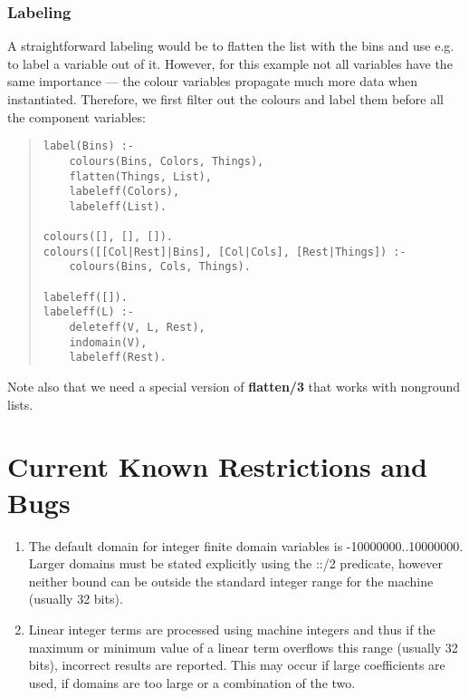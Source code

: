 \subsubsection{Labeling}
A straightforward labeling would be to flatten the list with
the bins and use e.g.\  to label a variable out of it.
However, for this example not all variables have the same
importance --- the colour variables propagate much more data
when instantiated.
Therefore, we first filter out the colours and label
them before all the component variables:
\begin{quote}
\begin{verbatim}
label(Bins) :-
    colours(Bins, Colors, Things),
    flatten(Things, List),
    labeleff(Colors),
    labeleff(List).

colours([], [], []).
colours([[Col|Rest]|Bins], [Col|Cols], [Rest|Things]) :-
    colours(Bins, Cols, Things).

labeleff([]).
labeleff(L) :-
    deleteff(V, L, Rest),
    indomain(V),
    labeleff(Rest).
\end{verbatim}
\end{quote}

Note also that we need a special version of {\bf flatten/3}
that works with nonground lists.

\section{Current Known Restrictions and Bugs}

\begin{enumerate}

\item The default domain for integer finite domain variables
is -10000000..10000000.
Larger domains must be stated explicitly using the ::/2 predicate,
however neither bound can be outside the standard integer
range for the machine (usually 32 bits).

\item Linear integer terms are processed using machine integers
and thus if the maximum or minimum value of a linear term
overflows this range (usually 32 bits), incorrect results
are reported.
This may occur if large coefficients are used, if domains are
too large or a combination of the two.

\end{enumerate}



